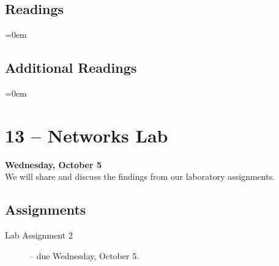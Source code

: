 \documentclass[10pt]{memoir}
\newenvironment{readinglist}{
\begin{list}{}{\leftmargin=8pt \itemindent=0em}
  \setlength{\itemsep}{8pt}
  \setlength{\parskip}{0em}
  \setlength{\parsep}{1em}
  \setlength{\parindent}{8em}}
{\end{list}}
\begin{document}
    \subsection{Readings}
    \begin{readinglist}
        \item {}
        \item {}
    \end{readinglist}
    
    \subsection{Additional Readings}
    \begin{readinglist}
        \item {}
        \item {}
        \item {}
        \item {}
        \item {}
        \item {}
        \item {}
        \item {}
    \end{readinglist}

\section{13 -- Networks Lab}
\textcolor{CUGold}{\textbf{Wednesday, October 5}}\\
We will share and discuss the findings from our laboratory assignments.

    \subsection{Assignments}
    \begin{description}%
        \item[Lab Assignment 2 ] -- due Wednesday, October 5. 
    \end{description}
\end{document}
